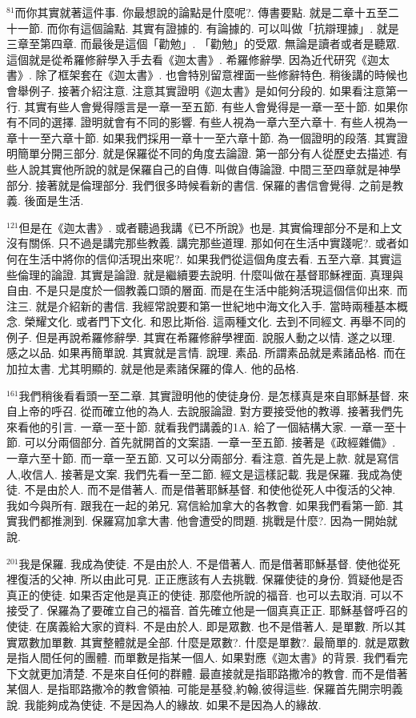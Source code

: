 \documentclass{book}
\begin{document}
$^{81}$而你其實就著這件事.
你最想說的論點是什麼呢?.
傳書要點.
就是二章十五至二十一節.
而你有這個論點.
其實有證據的.
有論據的.
可以叫做「抗辯理據」.
就是三章至第四章.
而最後是這個「勸勉」.
「勸勉」的受眾.
無論是讀者或者是聽眾.
這個就是從希羅修辭學入手去看《迦太書》.
希羅修辭學.
因為近代研究《迦太書》.
除了框架套在《迦太書》.
也會特別留意裡面一些修辭特色.
稍後講的時候也會舉例子.
接著介紹注意.
注意其實證明《迦太書》是如何分段的.
如果看注意第一行.
其實有些人會覺得隱言是一章一至五節.
有些人會覺得是一章一至十節.
如果你有不同的選擇.
證明就會有不同的影響.
有些人視為一章六至六章十.
有些人視為一章十一至六章十節.
如果我們採用一章十一至六章十節.
為一個證明的段落.
其實證明簡單分開三部分.
就是保羅從不同的角度去論證.
第一部分有人從歷史去描述.
有些人說其實他所說的就是保羅自己的自傳.
叫做自傳論證.
中間三至四章就是神學部分.
接著就是倫理部分.
我們很多時候看新的書信.
保羅的書信會覺得.
之前是教義.
後面是生活.

$^{121}$但是在《迦太書》.
或者聽過我講《已不所說》也是.
其實倫理部分不是和上文沒有關係.
只不過是講完那些教義.
講完那些道理.
那如何在生活中實踐呢?.
或者如何在生活中將你的信仰活現出來呢?.
如果我們從這個角度去看.
五至六章.
其實這些倫理的論證.
其實是論證.
就是繼續要去說明.
什麼叫做在基督耶穌裡面.
真理與自由.
不是只是度於一個教義口頭的層面.
而是在生活中能夠活現這個信仰出來.
而注三.
就是介紹新的書信.
我經常說要和第一世紀地中海文化入手.
當時兩種基本概念.
榮耀文化.
或者門下文化.
和恩比斯俗.
這兩種文化.
去到不同經文.
再舉不同的例子.
但是再說希羅修辭學.
其實在希羅修辭學裡面.
說服人動之以情.
遂之以理.
感之以品.
如果再簡單說.
其實就是言情.
說理.
素品.
所謂素品就是素諸品格.
而在加拉太書.
尤其明顯的.
就是他是素諸保羅的偉人.
他的品格.

$^{161}$我們稍後看看頭一至二章.
其實證明他的使徒身份.
是怎樣真是來自耶穌基督.
來自上帝的呼召.
從而確立他的為人.
去說服論證.
對方要接受他的教導.
接著我們先來看他的引言.
一章一至十節.
就看我們講義的1A.
給了一個結構大家.
一章一至十節.
可以分兩個部分.
首先就開首的文案語.
一章一至五節.
接著是《政經雜備》.
一章六至十節.
而一章一至五節.
又可以分兩部分.
看注意.
首先是上款.
就是寫信人,收信人.
接著是文案.
我們先看一至二節.
經文是這樣記載.
我是保羅.
我成為使徒.
不是由於人.
而不是借著人.
而是借著耶穌基督.
和使他從死人中復活的父神.
我如今與所有.
跟我在一起的弟兄.
寫信給加拿大的各教會.
如果我們看第一節.
其實我們都推測到.
保羅寫加拿大書.
他會遭受的問題.
挑戰是什麼?.
因為一開始就說.

$^{201}$我是保羅.
我成為使徒.
不是由於人.
不是借著人.
而是借著耶穌基督.
使他從死裡復活的父神.
所以由此可見.
正正應該有人去挑戰.
保羅使徒的身份.
質疑他是否真正的使徒.
如果否定他是真正的使徒.
那麼他所說的福音.
也可以去取消.
可以不接受了.
保羅為了要確立自己的福音.
首先確立他是一個真真正正.
耶穌基督呼召的使徒.
在廣義給大家的資料.
不是由於人.
即是眾數.
也不是借著人.
是單數.
所以其實眾數加單數.
其實整體就是全部.
什麼是眾數?.
什麼是單數?.
最簡單的.
就是眾數是指人間任何的團體.
而單數是指某一個人.
如果對應《迦太書》的背景.
我們看完下文就更加清楚.
不是來自任何的群體.
最直接就是指耶路撒冷的教會.
而不是借著某個人.
是指耶路撒冷的教會領袖.
可能是基發,約翰,彼得這些.
保羅首先開宗明義說.
我能夠成為使徒.
不是因為人的緣故.
如果不是因為人的緣故.
\end{document}
